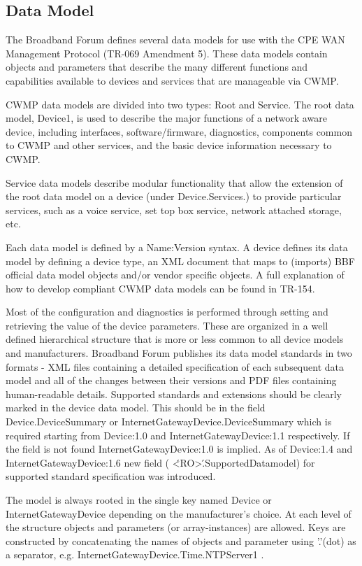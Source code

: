 \subsection{Data Model}
The Broadband Forum defines several data models for use with the CPE WAN Management Protocol (TR-069 Amendment 5). These data models contain objects and parameters that describe the many different functions and capabilities available to devices and services that are manageable via CWMP.

CWMP data models are divided into two types: Root and Service. The root data model, Device1, is used to describe the major functions of a network aware device, including interfaces, software/firmware, diagnostics, components common to CWMP and other services, and the basic device information necessary to CWMP.

Service data models describe modular functionality that allow the extension of the root data model on a device (under Device.Services.) to provide particular services, such as a voice service, set top box service, network attached storage, etc.

Each data model is defined by a Name:Version syntax. A device defines its data model by defining a device type, an XML document that maps to (imports) BBF official data model objects and/or vendor specific objects. A full explanation of how to develop compliant CWMP data models can be found in TR-154.

Most of the configuration and diagnostics is performed through setting and retrieving the value of the device parameters. These are organized in a well defined hierarchical structure that is more or less common to all device models and manufacturers. Broadband Forum publishes its data model standards in two formats - XML files containing a detailed specification of each subsequent data model and all of the changes between their versions and PDF files containing human-readable details. Supported standards and extensions should be clearly marked in the device data model. This should be in the field Device.DeviceSummary or InternetGatewayDevice.DeviceSummary which is required starting from Device:1.0 and InternetGatewayDevice:1.1 respectively. If the field is not found InternetGatewayDevice:1.0 is implied. As of Device:1.4 and InternetGatewayDevice:1.6 new field ( \'<RO>\'.SupportedDatamodel) for supported standard specification was introduced.

The model is always rooted in the single key named Device or InternetGatewayDevice depending on the manufacturer's choice. At each level of the structure objects and parameters (or array-instances) are allowed. Keys are constructed by concatenating the names of objects and parameter using '.'(dot) as a separator, e.g. InternetGatewayDevice.Time.NTPServer1 .

